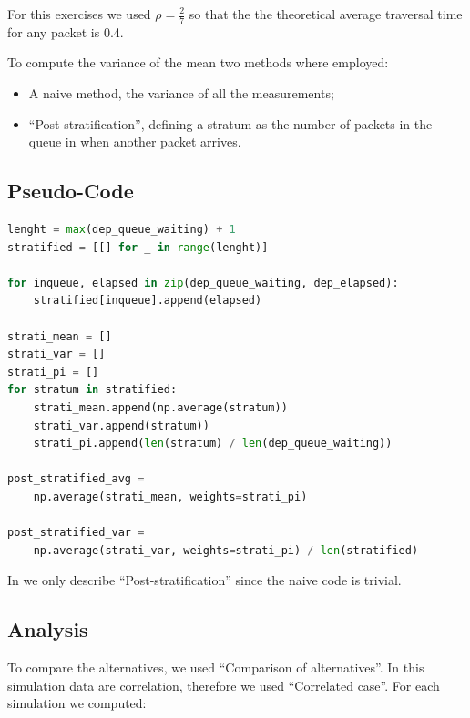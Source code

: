 \documentclass[10pt,a4paper]{article}
\begin{document}
For this exercises we used \(\rho = \frac{2}{7}\) so that the the theoretical average traversal time for any packet is 0.4.

To compute the variance of the mean two methods where employed:
\begin{itemize}
\item A naive method, the variance of all the measurements;
\item ``Post-stratification'', defining a stratum as the number of packets in the queue in when another packet arrives.
\end{itemize}

\subsection*{Pseudo-Code}

\begin{lstlisting}[language=python,caption={Post-stratification pseudo-code},captionpos=b,label={lst:post-stratififcation}]
lenght = max(dep_queue_waiting) + 1
stratified = [[] for _ in range(lenght)]

for inqueue, elapsed in zip(dep_queue_waiting, dep_elapsed):
    stratified[inqueue].append(elapsed)

strati_mean = []
strati_var = []
strati_pi = []
for stratum in stratified:
    strati_mean.append(np.average(stratum))
    strati_var.append(stratum))
    strati_pi.append(len(stratum) / len(dep_queue_waiting))

post_stratified_avg = 
    np.average(strati_mean, weights=strati_pi)

post_stratified_var =
    np.average(strati_var, weights=strati_pi) / len(stratified)
\end{lstlisting}

In  we only describe ``Post-stratification'' since the naive code is trivial.

\subsection*{Analysis}

To compare the alternatives, we used ``Comparison of alternatives''. In this simulation  data are correlation, therefore we used ``Correlated case''. For each simulation we computed:
\end{document}
